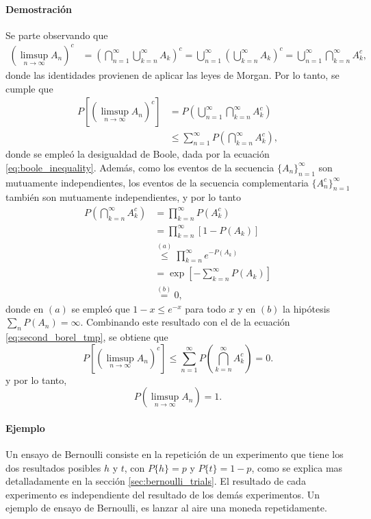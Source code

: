 \documentclass[a4paper]{report}
\begin{document}
\paragraph{Demostración} Se parte observando que
\begin{align*}
  \left(\limsup_{n\rightarrow\infty}A_n\right)^c&=\left(\bigcap_{n=1}^{\infty }\bigcup_{k=n}^{\infty }A_k\right)^c=\bigcup_{n=1}^{\infty}\left(\bigcup_{k=n}^{\infty}A_k\right)^c=\bigcup_{n=1}^{\infty}\bigcap_{k=n}^{\infty}A_k^c,
 \end{align*}
donde las identidades provienen de aplicar las leyes de Morgan. Por lo tanto, se cumple que
\begin{align}\label{eq:second_borel_tmp}
 P\left[\left(\limsup_{n\rightarrow\infty}A_n\right)^c\right]&=P\left(\bigcup_{n=1}^{\infty}\bigcap_{k=n}^{\infty}A_k^c\right)\nonumber \\ 
  &\leq \sum_{n=1}^{\infty}P\left(\bigcap_{k=n}^{\infty}A_k^c\right),
\end{align}
donde se empleó la desigualdad de Boole, dada por la ecuación \ref{eq:boole_inequality}.
Además, como los eventos de la secuencia \(\{A_n\}_{n=1}^{\infty}\) son mutuamente independientes, los eventos de la secuencia complementaria \(\{A_n^c\}_{n=1}^{\infty}\) también son mutuamente independientes, y por lo tanto
\begin{align*}
 P\left(\bigcap_{k=n}^{\infty}A_k^c\right)&=\prod_{k=n}^{\infty}P\left(A_k^c\right)\\
  &=\prod_{k=n}^{\infty}\left[1-P\left(A_k\right)\right]\\
  &\overset{(a)}{\leq}\prod_{k=n}^{\infty}e^{-P\left(A_k\right)}\\
  &=\exp\left[-\sum_{k=n}^{\infty}P\left(A_k\right)\right]\\
  &\overset{(b)}{=}0,
\end{align*}
donde en \((a)\) se empleó que \(1-x\leq e^{-x}\) para todo \(x\) y en \((b)\) la hipótesis \(\sum_n P(A_n)=\infty\). Combinando este resultado con el de la ecuación \ref{eq:second_borel_tmp}, se obtiene que
\[
 P\left[\left(\limsup_{n\rightarrow\infty}A_n\right)^c\right]\leq \sum_{n=1}^{\infty}P\left(\bigcap_{k=n}^{\infty}A_k^c\right)=0.
\]
y por lo tanto,
\[
 P\left(\limsup_{n\rightarrow\infty}A_n\right)=1.
\]

\paragraph{Ejemplo} Un ensayo de Bernoulli consiste en la repetición de un experimento que tiene los dos resultados posibles \(h\) y \(t\), con \(P\{h\}=p\) y \(P\{t\}=1-p\), como se explica mas detalladamente en la sección \ref{sec:bernoulli_trials}. El resultado de cada experimento es independiente del resultado de los demás experimentos. Un ejemplo de ensayo de Bernoulli, es lanzar al aire  una moneda repetidamente. 
\end{document}

